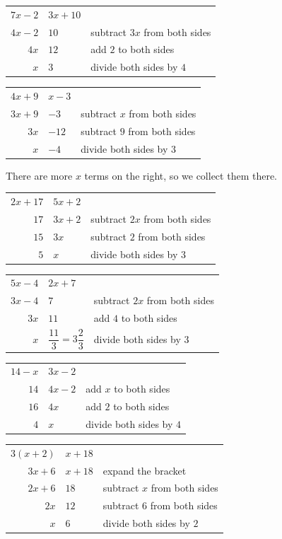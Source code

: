 \documentclass[aspectratio=169]{beamer}
\makeatletter
\newcommand{\steps}[1]{%
  \begin{tabular}{@{}r@{${}={}$}l@{\qquad}l@{}}#1\end{tabular}%
}
\newcommand{\by}[1]{{\normalsize #1}}
\makeatother
\begin{document}
  {\steps{$7x-2$ & $3x+10$ & \\
          $4x-2$ & $10$ & \by{subtract $3x$ from both sides}\\
          $4x$ & $12$ & \by{add $2$ to both sides}\\
          $x$ & $3$ & \by{divide both sides by $4$}}}

  {\steps{$4x+9$ & $x-3$ & \\
          $3x+9$ & $-3$ & \by{subtract $x$ from both sides}\\
          $3x$ & $-12$ & \by{subtract $9$ from both sides}\\
          $x$ & $-4$ & \by{divide both sides by $3$}}}

  {There are more $x$ terms on the right, so we collect them there.
   \par\vspace{0.4em}
   \steps{$2x+17$ & $5x+2$ & \\
          $17$ & $3x+2$ & \by{subtract $2x$ from both sides}\\
          $15$ & $3x$ & \by{subtract $2$ from both sides}\\
          $5$ & $x$ & \by{divide both sides by $3$}}}

  {\steps{$5x-4$ & $2x+7$ & \\[0.2em]
          $3x-4$ & $7$ & \by{subtract $2x$ from both sides}\\[0.2em]
          $3x$ & $11$ & \by{add $4$ to both sides}\\[0.2em]
          $x$ & $\dfrac{11}{3}=3\dfrac{2}{3}$ & \by{divide both sides by $3$}}}

  {\steps{$14-x$ & $3x-2$ & \\
          $14$ & $4x-2$ & \by{add $x$ to both sides}\\
          $16$ & $4x$ & \by{add $2$ to both sides}\\
          $4$ & $x$ & \by{divide both sides by $4$}}}

  {\steps{$3(x+2)$ & $x+18$ & \\
          $3x+6$ & $x+18$ & \by{expand the bracket}\\
          $2x+6$ & $18$ & \by{subtract $x$ from both sides}\\
          $2x$ & $12$ & \by{subtract $6$ from both sides}\\
          $x$ & $6$ & \by{divide both sides by $2$}}}
\end{document}
